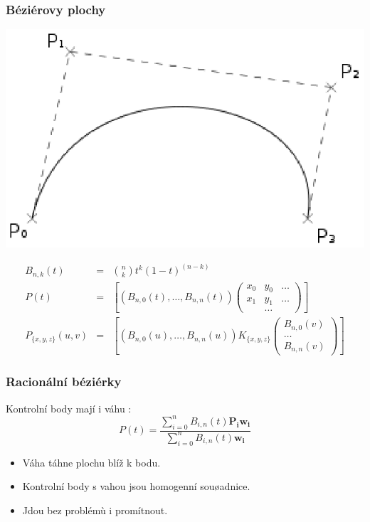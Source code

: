 \begin{frame}
    \frametitle{Béziérovy plochy}

    \includegraphics[height=.3\textheight]{pics/tessellationBezier/bezier.eps}

    \begin{eqnarray*}
        B_{n,k}(t) &=& {n\choose k}t^k\left(1-t\right)^{\left(n-k\right)}\\
        P(t)      &=& \left[\left(B_{n,0}(t),\ldots,B_{n,n}(t)\right)\left(
            \begin{array}{ccc}
                x_0 & y_0 & \ldots\\
                x_1 & y_1 & \ldots\\
                &\ldots&
            \end{array}\right)\right]\\
        P_{\{x,y,z\}}(u,v) &=& \left[\left(B_{n,0}(u),\ldots,B_{n,n}(u)\right)K_{\{x,y,z\}}\left(
            \begin{array}{c}B_{n,0}(v)\\\ldots\\B_{n,n}(v)\end{array}\right)\right]
    \end{eqnarray*}
\end{frame}

\begin{frame}
    \frametitle{Racionální béziérky}

    Kontrolní body mají i váhu :
    \begin{equation*}
        P(t) = \frac{ \sum_{i=0}^n B_{i,n}(t) \mathbf{P_i w_i} }{ \sum_{i=0}^n B_{i,n}(t) \mathbf{w_i} }
    \end{equation*}
    \pause\vfill
    \begin{itemize}
        \item Váha táhne plochu blíž k bodu.
        \item Kontrolní body s vahou jsou homogenní souøadnice.
        \item Jdou bez problémù i promítnout.
    \end{itemize}
\end{frame}    

